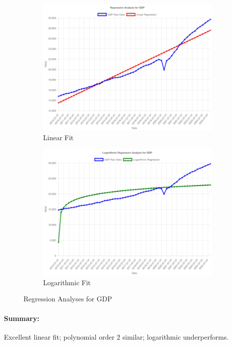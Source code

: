 \documentclass[11pt,a4paper]{article}
\begin{document}
\begin{figure}[htbp]
  \centering
  \begin{subfigure}[b]{0.48\textwidth}
    \includegraphics[width=\textwidth]{backend/analyses/GDP_analysis.png}
    \caption{Linear Fit}
  \end{subfigure}
  \hfill
  \begin{subfigure}[b]{0.48\textwidth}
    \includegraphics[width=\textwidth]{backend/analyses/GDP_log_analysis.png}
    \caption{Logarithmic Fit}
  \end{subfigure}
  \caption{Regression Analyses for GDP}
\end{figure}

\paragraph{Summary:}
Excellent linear fit; polynomial order 2 similar; logarithmic underperforms.
\end{document}
